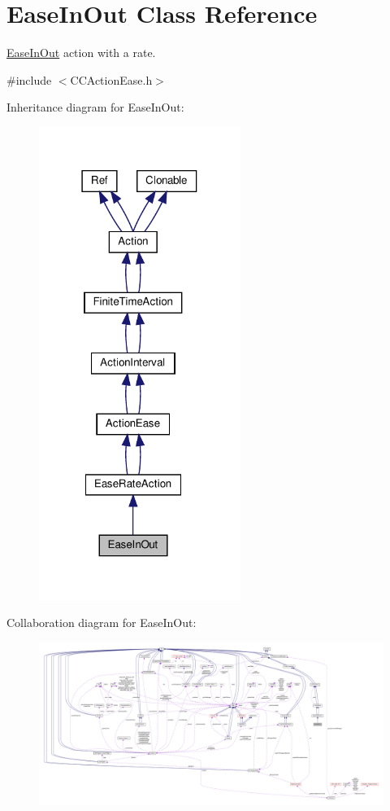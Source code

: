 \hypertarget{classEaseInOut}{}\section{Ease\+In\+Out Class Reference}
\label{classEaseInOut}


\hyperlink{classEaseInOut}{Ease\+In\+Out} action with a rate.  




{\ttfamily \#include $<$C\+C\+Action\+Ease.\+h$>$}



Inheritance diagram for Ease\+In\+Out\+:
\nopagebreak
\begin{figure}[H]
\begin{center}
\leavevmode
\includegraphics[width=186pt]{classEaseInOut__inherit__graph}
\end{center}
\end{figure}


Collaboration diagram for Ease\+In\+Out\+:
\nopagebreak
\begin{figure}[H]
\begin{center}
\leavevmode
\includegraphics[width=350pt]{classEaseInOut__coll__graph}
\end{center}
\end{figure}
